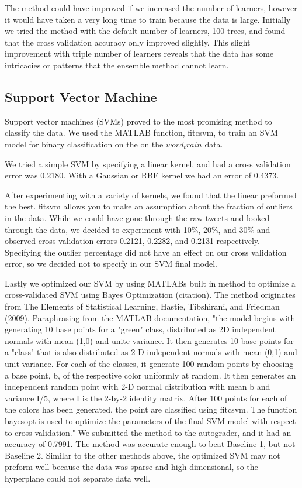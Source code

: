 \documentclass[]{article}
\begin{document}
The method could have improved if we increased the number of learners, however it would have taken a very long time to train because the data is large. Initially we tried the method with the default number of learners, 100 trees, and found that the cross validation accuracy only improved slightly. This slight improvement with triple number of learners reveals that the data has some intricacies or patterns that the ensemble method cannot learn.   


\subsection{Support Vector Machine}

Support vector machines (SVMs) proved to the most promising method to classify the data. We used the MATLAB function, fitcsvm, to train an SVM model for binary classification on the on the $word_train$ data.

We tried a simple SVM by specifying a linear kernel, and had a  cross validation error was 0.2180. With a Gaussian or RBF kernel we had an error of 0.4373. 


After experimenting with a variety of kernels, we found that the linear preformed the best. fitsvm allows you to make an assumption about the fraction of outliers in the data. While we could have gone through the raw tweets and looked through the data, we decided to experiment with  10\%, 20\%, and 30\% and observed cross validation errors 0.2121, 0.2282, and 0.2131 respectively. Specifying the outlier percentage did not have an effect on our cross validation error, so we decided not to specify in our SVM final model. 

Lastly we optimized our SVM by using MATLABs built in method to optimize a cross-validated SVM using Bayes Optimization (citation). The method originates from The Elements of Statistical Learning, Hastie, Tibshirani, and Friedman (2009). Paraphrasing from the MATLAB documentation,  "the model begins with generating 10 base points for a "green" class, distributed as 2D independent normals with mean (1,0) and unite variance. It then generates 10 base points for a "class" that is also distributed as 2-D independent normals with mean (0,1) and unit variance. For each of the classes, it generate 100 random points by choosing a base point, b, of the respective color uniformly at random. It then generates an independent random point with 2-D normal distribution with mean b and variance I/5, where I is the 2-by-2 identity matrix. After 100 points for each of the colors has been generated, the point are classified using fitcsvm. The function bayesopt is used to optimize the parameters of the final SVM model with respect to cross validation." We submitted the method to the autograder, and it had an accuracy of 0.7991. The method was accurate enough to beat Baseline 1, but not Baseline 2. Similar to the other methods above, the optimized SVM may not preform well because the data was sparse and high dimensional, so the hyperplane could not separate data well. 
\end{document}
